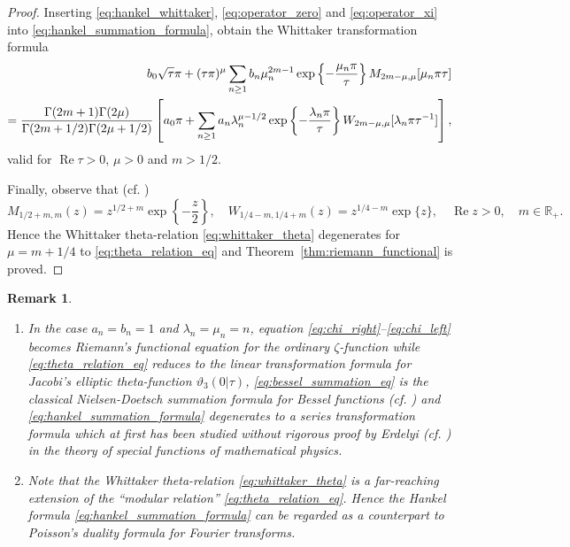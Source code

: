 \documentclass[11pt]{article}
\theoremstyle{plain}
\newtheorem{remark}[theorem]{Remark}
\begin{document}
\begin{proof}
Inserting \eqref{eq:hankel_whittaker}, \eqref{eq:operator_zero} and \eqref{eq:operator_xi} into \eqref{eq:hankel_summation_formula}, obtain the Whittaker transformation formula
\begin{align}
b_0 \sqrt{\tau} \pi + (\tau \pi)^\mu \sum_{n \geq 1} b_n \mu_n^{2m-1} \exp\left\{-\frac{\mu_n \pi}{\tau}\right\} M_{2m-\mu, \mu}[\mu_n \pi \tau] \notag \\
= \frac{\Gamma(2m + 1) \Gamma(2\mu)}{\Gamma(2m + 1/2) \Gamma(2\mu + 1/2)} \left[ a_0 \pi + \sum_{n \geq 1} a_n \lambda_n^{\mu-1/2} \exp\left\{-\frac{\lambda_n \pi}{\tau}\right\} W_{2m-\mu, \mu}[\lambda_n \pi \tau^{-1}] \right],
\label{eq:whittaker_theta}
\end{align}
valid for $\operatorname{Re} \tau > 0$, $\mu > 0$ and $m > 1/2$.

Finally, observe that (cf. \cite{16})
\begin{equation}
M_{1/2 + m, m}(z) = z^{1/2 + m} \exp\left\{-\frac{z}{2}\right\}, \quad W_{1/4 - m, 1/4 + m}(z) = z^{1/4 - m} \exp\{z\}, \quad \operatorname{Re} z > 0, \quad m \in \mathbb{R}_+.
\label{eq:whittaker_special}
\end{equation}
Hence the Whittaker theta-relation \eqref{eq:whittaker_theta} degenerates for $\mu = m + 1/4$ to \eqref{eq:theta_relation_eq} and Theorem~\ref{thm:riemann_functional} is proved.
\end{proof}

\begin{remark}
\label{rem:remarks_2_5}
\begin{enumerate}[label=(\roman*)]
\item In the case $a_n = b_n = 1$ and $\lambda_n = \mu_n = n$, equation \eqref{eq:chi_right}--\eqref{eq:chi_left} becomes Riemann's functional equation for the ordinary $\zeta$-function while \eqref{eq:theta_relation_eq} reduces to the linear transformation formula for Jacobi's elliptic theta-function $\vartheta_3(0|\tau)$, \eqref{eq:bessel_summation_eq} is the classical Nielsen-Doetsch summation formula for Bessel functions (cf. \cite{15,31}) and \eqref{eq:hankel_summation_formula} degenerates to a series transformation formula which at first has been studied without rigorous proof by Erdelyi (cf. \cite{1,17}) in the theory of special functions of mathematical physics.
\item Note that the Whittaker theta-relation \eqref{eq:whittaker_theta} is a far-reaching extension of the ``modular relation'' \eqref{eq:theta_relation_eq}. Hence the Hankel formula \eqref{eq:hankel_summation_formula} can be regarded as a counterpart to Poisson's duality formula for Fourier transforms.
\end{enumerate}
\end{remark}
\end{document}
